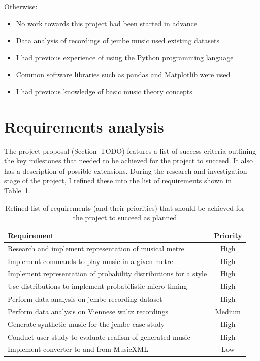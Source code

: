 \documentclass[12pt,twoside,openright]{report}
\begin{document}
Otherwise:
\begin{itemize}
	\item No work towards this project had been started in advance
	\item Data analysis of recordings of jembe music used existing datasets
	\item I had previous experience of using the Python programming language
	\item Common software libraries such as pandas and Matplotlib were used
	\item I had previous knowledge of basic music theory concepts
\end{itemize}



\section{Requirements analysis} \label{requirements_analysis}

The project proposal (Section~TODO) features a list of success criteria outlining the
key milestones that needed to be achieved for the project to succeed. It also
has a description of possible extensions. During the research and investigation
stage of the project, I refined these into the list of requirements shown in
Table~\ref{table:requirements}.

\begin{table}
\centering
\begin{tabular}{|l|c|}
    \hline
    \textbf{Requirement}                                      & \textbf{Priority} \\
    \hline
    Research and implement representation of musical metre              & High \\
    Implement commands to play music in a given metre                   & High \\
    Implement representation of probability distributions for a style   & High \\
    Use distributions to implement probabilistic micro-timing           & High \\
    Perform data analysis on jembe recording dataset                    & High \\
    Perform data analysis on Viennese waltz recordings                  & Medium \\
    Generate synthetic music for the jembe case study                   & High \\
    Conduct user study to evaluate realism of generated music           & High \\
    Implement converter to and from MusicXML                            & Low \\
    \hline
\end{tabular}
\caption{Refined list of requirements (and their priorities) that should be achieved for the project to succeed as planned}
\label{table:requirements}
\end{table}
\end{document}
